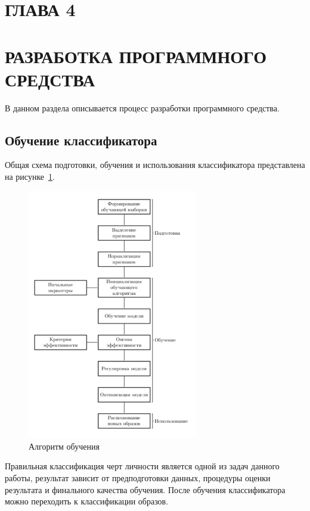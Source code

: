 \section*{ГЛАВА 4}
\section*{РАЗРАБОТКА ПРОГРАММНОГО СРЕДСТВА}
\setcounter{section}{4}
\setcounter{subsection}{0}
\bigskip

В данном раздела описывается процесс разработки программного \mbox{средства.}

\subsection{Обучение классификатора}
Общая схема подготовки, обучения и использования классификатора представлена на рисунке~\ref{fig:develoipment:svm_flow}.

\begin{figure}[ht]
    \centering
    \includegraphics[width=0.66\textwidth]{figures/SVM_flow.png}
    \caption{Алгоритм обучения}
    \label{fig:develoipment:svm_flow}
\end{figure}

Правильная классификация черт личности является одной из задач данного работы, результат зависит от предподготовки данных, процедуры оценки результата и финального качества обучения. После обучения классификатора можно переходить к классификации образов. 

